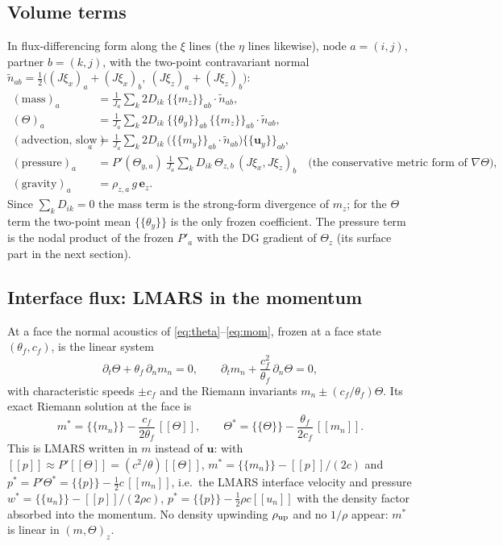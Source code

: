 \documentclass[11pt,a4paper]{article}
\newcommand{\avg}[1]{\{\!\{#1\}\!\}}
\newcommand{\jump}[1]{[\![#1]\!]}
\begin{document}
\subsection{Volume terms}
In flux-differencing form along the $\xi$ lines (the $\eta$ lines likewise), node $a=(i,j)$, partner
$b=(k,j)$, with the two-point contravariant normal $\tilde n_{ab}=\tfrac12\big((J\xi_x)_a+(J\xi_x)_b,\ (J\xi_z)_a+(J\xi_z)_b\big)$:
\begin{align*}
(\text{mass})_a&=\frac1{J_a}\sum_k 2D_{ik}\ \avg{m_z}_{ab}\cdot\tilde n_{ab},\\
(\Theta)_a&=\frac1{J_a}\sum_k 2D_{ik}\ \avg{\theta_y}_{ab}\,\avg{m_z}_{ab}\cdot\tilde n_{ab},\\
(\text{advection, slow})_a&=\frac1{J_a}\sum_k 2D_{ik}\ \big(\avg{m_y}_{ab}\cdot\tilde n_{ab}\big)\avg{\mathbf u_y}_{ab},\\
(\text{pressure})_a&=P'(\Theta_{y,a})\ \frac1{J_a}\sum_k D_{ik}\,\Theta_{z,b}\,(J\xi_x,J\xi_z)_b
\quad\big(\text{the conservative metric form of }\nabla\Theta\big),\\
(\text{gravity})_a&=\rho_{z,a}\,g\,\mathbf e_z .
\end{align*}
Since $\sum_kD_{ik}=0$ the mass term is the strong-form divergence of $m_z$; for the $\Theta$ term the
two-point mean $\avg{\theta_y}$ is the only frozen coefficient. The pressure term is the nodal product of
the frozen $P'_a$ with the DG gradient of $\Theta_z$ (its surface part in the next section).

\subsection{Interface flux: LMARS in the momentum}
At a face the normal acoustics of \eqref{eq:theta}--\eqref{eq:mom}, frozen at a face state
$(\theta_f, c_f)$, is the linear system
\[
\partial_t\Theta+\theta_f\,\partial_n m_n=0,\qquad
\partial_t m_n+\frac{c_f^2}{\theta_f}\,\partial_n\Theta=0,
\]
with characteristic speeds $\pm c_f$ and the Riemann invariants $m_n\pm (c_f/\theta_f)\Theta$. Its exact
Riemann solution at the face is
\begin{equation}
m^*=\avg{m_n}-\frac{c_f}{2\theta_f}\,\jump{\Theta},\qquad
\Theta^*=\avg{\Theta}-\frac{\theta_f}{2c_f}\,\jump{m_n}.\label{eq:riemann}
\end{equation}
This is LMARS written in $m$ instead of $\mathbf u$: with $\jump p\approx P'\jump\Theta=(c^2/\theta)\jump\Theta$,
$m^*=\avg{m_n}-\jump p/(2c)$ and $p^*=P'\Theta^*=\avg p-\tfrac12 c\,\jump{m_n}$, i.e.\ the LMARS
interface velocity and pressure $w^*=\avg{u_n}-\jump p/(2\rho c)$, $p^*=\avg p-\tfrac12\rho c\jump{u_n}$ with the
density factor absorbed into the momentum. No density upwinding $\rho_{\rm up}$ and no $1/\rho$ appear:
$m^*$ is linear in $(m,\Theta)_z$.
\end{document}
